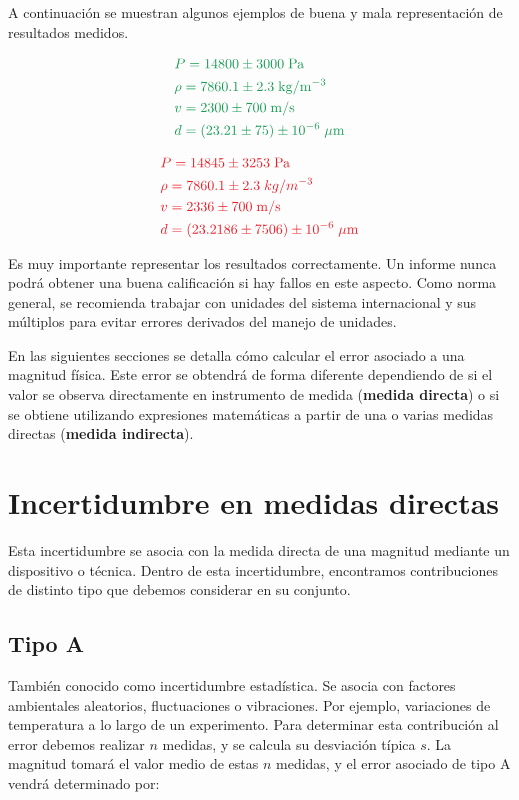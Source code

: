 \documentclass{book}
\begin{document}
A continuación se muestran algunos ejemplos de buena y mala representación de resultados medidos.

\begin{equation}
  \begin{aligned}
    & \color{ForestGreen} P = 14800 \pm 3000 \; \mathrm{Pa} \\
    & \color{ForestGreen} \rho = 7860.1 \pm 2.3 \; \mathrm{kg / m^{-3}} \\
    & \color{ForestGreen} v = 2300 \pm 700 \; \mathrm{m/s} \\
    & \color {ForestGreen} d = ( 23.21 \pm 75 ) \pm 10^{-6} \; \mathrm{\mu m}
  \end{aligned}
\end{equation}

\begin{equation}
  \begin{aligned}
    & \color{Red} P = 14845 \pm 3253 \; \mathrm{Pa} \\
    & \color{Red} \rho = 7860.1 \pm 2.3 \; kg / m^{-3} \\
    & \color{Red} v = 2336 \pm 700 \; \mathrm{m/s} \\
    & \color {Red} d = ( 23.2186 \pm 7506 ) \pm 10^{-6} \; \mathrm{\mu m}
  \end{aligned}
\end{equation}


Es muy importante representar los resultados correctamente. Un informe nunca podrá obtener una
buena calificación si hay fallos en este aspecto. Como norma general, se recomienda trabajar con
unidades del sistema internacional y sus múltiplos para evitar errores derivados del manejo de
unidades.

En las siguientes secciones se detalla cómo calcular el error asociado a una magnitud física. 
Este error se obtendrá de forma diferente dependiendo de si el valor se observa directamente en
instrumento de medida (\textbf{medida directa}) o si se obtiene utilizando expresiones matemáticas a partir
de una o varias medidas directas (\textbf{medida indirecta}).


\section{Incertidumbre en medidas directas}
Esta incertidumbre se asocia con la medida directa de una magnitud mediante un dispositivo o técnica.
Dentro de esta incertidumbre, encontramos contribuciones de distinto tipo que debemos considerar
en su conjunto.
\subsection{Tipo A}
También conocido como incertidumbre estadística. Se asocia con factores ambientales aleatorios, 
fluctuaciones o vibraciones. Por ejemplo, variaciones de temperatura a lo largo de un experimento.
Para determinar esta contribución al error debemos realizar $n$ medidas, y se calcula su desviación
típica $s$. La magnitud tomará el valor medio de estas $n$ medidas, y el error asociado de tipo A 
vendrá determinado por:
\end{document}
